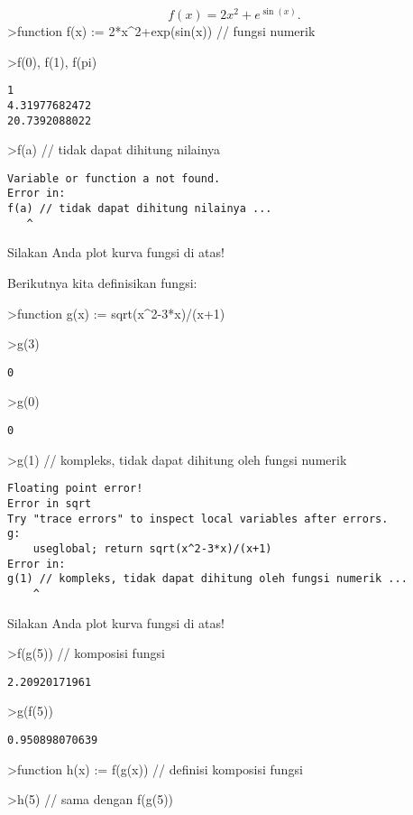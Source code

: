 \documentclass[
]{book}
\begin{document}
\[f(x)=2x^2+e^{\sin(x)}.\]\textgreater function f(x) := 2*x\^{}2+exp(sin(x)) // fungsi numerik

\textgreater f(0), f(1), f(pi)

\begin{verbatim}
1
4.31977682472
20.7392088022
\end{verbatim}

\textgreater f(a) // tidak dapat dihitung nilainya

\begin{verbatim}
Variable or function a not found.
Error in:
f(a) // tidak dapat dihitung nilainya ...
   ^
\end{verbatim}

Silakan Anda plot kurva fungsi di atas!

Berikutnya kita definisikan fungsi:

\textgreater function g(x) := sqrt(x\^{}2-3*x)/(x+1)

\textgreater g(3)

\begin{verbatim}
0
\end{verbatim}

\textgreater g(0)

\begin{verbatim}
0
\end{verbatim}

\textgreater g(1) // kompleks, tidak dapat dihitung oleh fungsi numerik

\begin{verbatim}
Floating point error!
Error in sqrt
Try "trace errors" to inspect local variables after errors.
g:
    useglobal; return sqrt(x^2-3*x)/(x+1) 
Error in:
g(1) // kompleks, tidak dapat dihitung oleh fungsi numerik ...
    ^
\end{verbatim}

Silakan Anda plot kurva fungsi di atas!

\textgreater f(g(5)) // komposisi fungsi

\begin{verbatim}
2.20920171961
\end{verbatim}

\textgreater g(f(5))

\begin{verbatim}
0.950898070639
\end{verbatim}

\textgreater function h(x) := f(g(x)) // definisi komposisi fungsi

\textgreater h(5) // sama dengan f(g(5))
\end{document}
